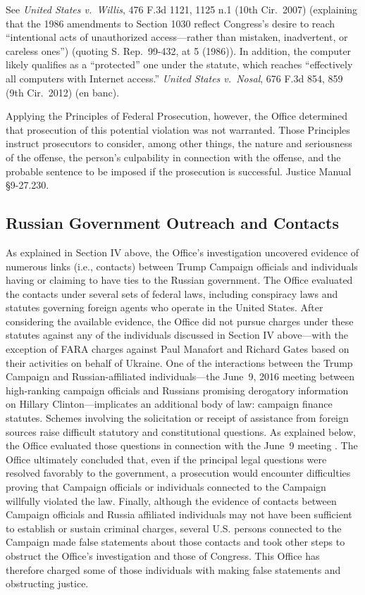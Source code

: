 See \textit{United States v.\ Willis}, 476 F.3d 1121, 1125 n.1 (10th Cir.~2007) (explaining that the 1986 amendments to Section 1030 reflect Congress's desire to reach ``intentional acts of unauthorized access---rather than mistaken, inadvertent, or careless ones'') (quoting S. Rep.~99-432, at 5 (1986)).
In addition, the computer  likely qualifies as a ``protected'' one under the statute, which reaches ``effectively all computers with Internet access.''
\textit{United States v.\ Nosal}, 676 F.3d 854, 859 (9th Cir.~2012) (en banc).

Applying the Principles of Federal Prosecution, however, the Office determined that prosecution of this potential violation was not warranted.
Those Principles instruct prosecutors to consider, among other things, the nature and seriousness of the offense, the person's culpability in connection with the offense, and the probable sentence to be imposed if the prosecution is successful.
Justice Manual \S 9-27.230. 

\subsection{Russian Government Outreach and Contacts}
As explained in Section IV above, the Office's investigation uncovered evidence of numerous links (i.e., contacts) between Trump Campaign officials and individuals having or claiming to have ties to the Russian government.
The Office evaluated the contacts under several sets of federal laws, including conspiracy laws and statutes governing foreign agents who operate in the United States.
After considering the available evidence, the Office did not pursue charges under these statutes against any of the individuals discussed in Section IV above---with the exception of FARA charges against Paul Manafort and Richard Gates based on their activities on behalf of Ukraine.
One of the interactions between the Trump Campaign and Russian-affiliated individuals---the June~9, 2016 meeting between high-ranking campaign officials and Russians promising derogatory information on Hillary Clinton---implicates an additional body of law: campaign finance statutes.
Schemes involving the solicitation or receipt of assistance from foreign sources raise difficult statutory and constitutional questions.
As explained below, the Office evaluated those questions in connection with the June~9 meeting .
The Office ultimately concluded that, even if the principal legal questions were resolved favorably to the government, a prosecution would encounter difficulties proving that Campaign officials or individuals connected to the Campaign willfully violated the law.
Finally, although the evidence of contacts between Campaign officials and Russia affiliated individuals may not have been sufficient to establish or sustain criminal charges, several U.S. persons connected to the Campaign made false statements about those contacts and took other steps to obstruct the Office's investigation and those of Congress.
This Office has therefore charged some of those individuals with making false statements and obstructing justice.

